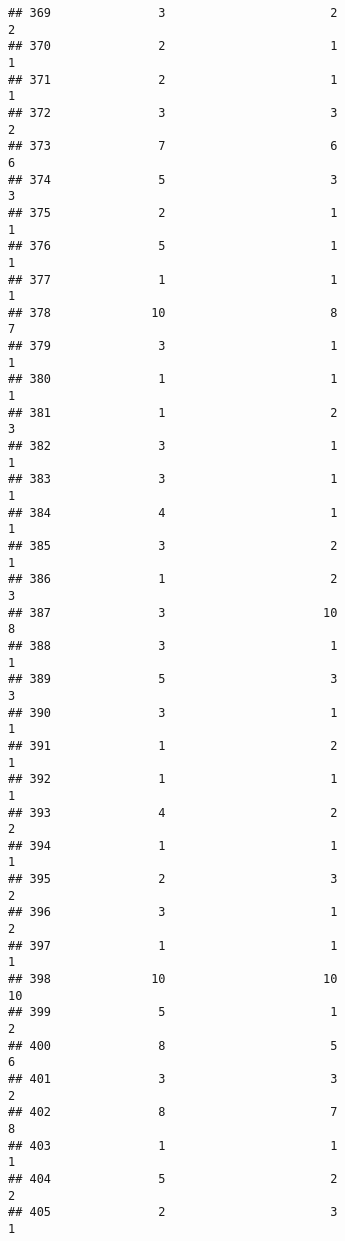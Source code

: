 \documentclass[
]{article}
\begin{document}
\begin{verbatim}
## 369               3                       2                        2
## 370               2                       1                        1
## 371               2                       1                        1
## 372               3                       3                        2
## 373               7                       6                        6
## 374               5                       3                        3
## 375               2                       1                        1
## 376               5                       1                        1
## 377               1                       1                        1
## 378              10                       8                        7
## 379               3                       1                        1
## 380               1                       1                        1
## 381               1                       2                        3
## 382               3                       1                        1
## 383               3                       1                        1
## 384               4                       1                        1
## 385               3                       2                        1
## 386               1                       2                        3
## 387               3                      10                        8
## 388               3                       1                        1
## 389               5                       3                        3
## 390               3                       1                        1
## 391               1                       2                        1
## 392               1                       1                        1
## 393               4                       2                        2
## 394               1                       1                        1
## 395               2                       3                        2
## 396               3                       1                        2
## 397               1                       1                        1
## 398              10                      10                       10
## 399               5                       1                        2
## 400               8                       5                        6
## 401               3                       3                        2
## 402               8                       7                        8
## 403               1                       1                        1
## 404               5                       2                        2
## 405               2                       3                        1

\end{verbatim}
\end{document}
